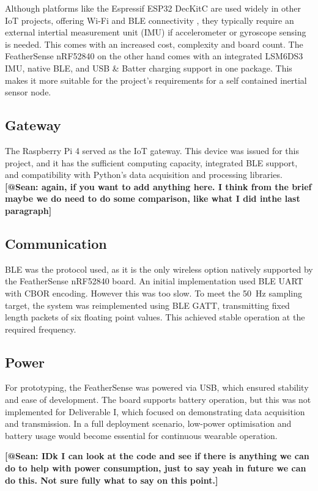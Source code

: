 \documentclass[conference]{IEEEtran}
\begin{document}
Although platforms like the Espressif ESP32 DecKitC are used widely in other IoT projects, offering Wi-Fi and BLE connectivity \cite{b8}, they typically require an external intertial measurement unit (IMU) if accelerometer or gyroscope sensing is needed. This comes with an increased cost, complexity and board count. The FeatherSense nRF52840 on the other hand comes with an integrated LSM6DS3 IMU, native BLE, and USB \& Batter charging support in one package. This makes it more suitable for the project's requirements for a self contained inertial sensor node.


\subsection{Gateway}\label{GW}
The Raspberry Pi 4 served as the IoT gateway. This device was issued for this project, and it has the sufficient computing capacity, integrated BLE support, and compatibility with Python's data acquisition and processing libraries. 
\textbf{[@Sean: again, if you want to add anything here. I think from the brief maybe we do need to do some comparison, like what I did inthe last paragraph]} 

\subsection{Communication}\label{COM}
BLE was the protocol used, as it is the only wireless option natively supported by the FeatherSense nRF52840 board. An initial implementation used BLE UART with CBOR encoding. However this was too slow. To meet the 50~Hz sampling target, the system was reimplemented using BLE GATT, transmitting fixed length packets of six floating point values. This achieved stable operation at the required frequency.

\subsection{Power}
For prototyping, the FeatherSense was powered via USB, which ensured stability and ease of development. The board supports battery operation, but this was not implemented for Deliverable I, which focused on demonstrating data acquisition and transmission. In a full deployment scenario, low-power optimisation and battery usage would become essential for continuous wearable operation.

\textbf{[@Sean: IDk I can look at the code and see if there is anything we can do to help with power consumption, just to say yeah in future we can do this. Not sure fully what to say on this point.]} 
\end{document}
